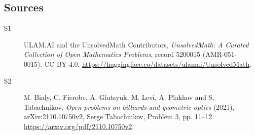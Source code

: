 \documentclass[11pt]{article}
\begin{document}
\subsection{Sources}
\begin{description}
\item[\hypertarget{source:5200015:1}{S1}] ULAM.AI and the UnsolvedMath Contributors, \emph{UnsolvedMath: A Curated Collection of Open Mathematics Problems}, record 5200015 (AMR-051-0015). CC BY 4.0. \url{https://huggingface.co/datasets/ulamai/UnsolvedMath}.
\item[\hypertarget{source:5200015:2}{S2}] M. Bialy, C. Fierobe, A. Glutsyuk, M. Levi, A. Plakhov and S. Tabachnikov, \emph{Open problems on billiards and geometric optics} (2021), arXiv:2110.10750v2, Serge Tabachnikov, Problem 3, pp. 11--12. \url{https://arxiv.org/pdf/2110.10750v2}.
\end{description}
\label{end:5200015}
\end{document}
